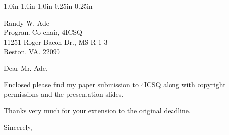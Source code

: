 
 {1.0in}  {1.0in} {1.0in} {0.25in} {0.25in}

\makelabels



\address{548 Kaimake Loop\\
         Kailua, HI 96734}
\indentclosing

\begin {letter}
                     {Randy W. Ade\\
                     Program Co-chair, 4ICSQ\\
                     11251 Roger Bacon Dr., MS R-1-3\\
                     Reston, VA. 22090}

\opening{Dear Mr. Ade,}

Enclosed please find my paper submission to 4ICSQ along with 
copyright permissions and the presentation slides. 

Thanks very much for your extension to the original deadline. 

\closing{Sincerely,}

\end{letter}




